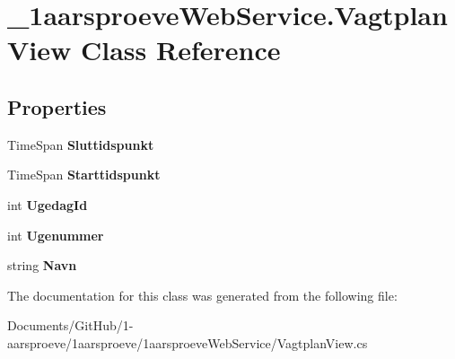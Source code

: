 \hypertarget{class__1aarsproeve_web_service_1_1_vagtplan_view}{}\section{\+\_\+1aarsproeve\+Web\+Service.\+Vagtplan\+View Class Reference}
\label{class__1aarsproeve_web_service_1_1_vagtplan_view}
\subsection*{Properties}
\begin{DoxyCompactItemize}
\item 
\hypertarget{class__1aarsproeve_web_service_1_1_vagtplan_view_a734cb98e4fda121fe31f24a456ec0442}{}Time\+Span {\bfseries Sluttidspunkt}\label{class__1aarsproeve_web_service_1_1_vagtplan_view_a734cb98e4fda121fe31f24a456ec0442}

\item 
\hypertarget{class__1aarsproeve_web_service_1_1_vagtplan_view_a10fe6ac31bc9731a4123a43ed4b3eb56}{}Time\+Span {\bfseries Starttidspunkt}\label{class__1aarsproeve_web_service_1_1_vagtplan_view_a10fe6ac31bc9731a4123a43ed4b3eb56}

\item 
\hypertarget{class__1aarsproeve_web_service_1_1_vagtplan_view_a51209b7dc268628037202be31a7963ac}{}int {\bfseries Ugedag\+Id}\label{class__1aarsproeve_web_service_1_1_vagtplan_view_a51209b7dc268628037202be31a7963ac}

\item 
\hypertarget{class__1aarsproeve_web_service_1_1_vagtplan_view_a2268784f2c93defa57bd6655ad1f1989}{}int {\bfseries Ugenummer}\label{class__1aarsproeve_web_service_1_1_vagtplan_view_a2268784f2c93defa57bd6655ad1f1989}

\item 
\hypertarget{class__1aarsproeve_web_service_1_1_vagtplan_view_aa2bf47af05a46d6972af79b2681dfcee}{}string {\bfseries Navn}\label{class__1aarsproeve_web_service_1_1_vagtplan_view_aa2bf47af05a46d6972af79b2681dfcee}

\end{DoxyCompactItemize}


The documentation for this class was generated from the following file\+:\begin{DoxyCompactItemize}
\item 
Documents/\+Git\+Hub/1-\/aarsproeve/1aarsproeve/1aarsproeve\+Web\+Service/Vagtplan\+View.\+cs\end{DoxyCompactItemize}
